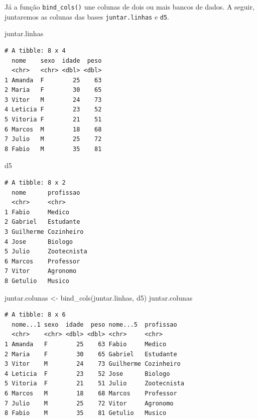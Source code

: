 \documentclass[
  brazilian,
]{book}
\newenvironment{Shaded}{\begin{snugshade}}{\end{snugshade}}
\newcommand{\FunctionTok}[1]{\textcolor[rgb]{0.00,0.00,0.00}{#1}}
\newcommand{\NormalTok}[1]{#1}
\newcommand{\OtherTok}[1]{\textcolor[rgb]{0.56,0.35,0.01}{#1}}
\begin{document}
Já a função \texttt{bind\_cols()} une colunas de dois ou mais bancos de dados. A seguir, juntaremos as colunas das bases \texttt{juntar.linhas} e \texttt{d5}.

\begin{Shaded}
\begin{Highlighting}[]
\NormalTok{juntar.linhas}
\end{Highlighting}
\end{Shaded}

\begin{verbatim}
# A tibble: 8 x 4
  nome    sexo  idade  peso
  <chr>   <chr> <dbl> <dbl>
1 Amanda  F        25    63
2 Maria   F        30    65
3 Vitor   M        24    73
4 Leticia F        23    52
5 Vitoria F        21    51
6 Marcos  M        18    68
7 Julio   M        25    72
8 Fabio   M        35    81
\end{verbatim}

\begin{Shaded}
\begin{Highlighting}[]
\NormalTok{d5}
\end{Highlighting}
\end{Shaded}

\begin{verbatim}
# A tibble: 8 x 2
  nome      profissao  
  <chr>     <chr>      
1 Fabio     Medico     
2 Gabriel   Estudante  
3 Guilherme Cozinheiro 
4 Jose      Biologo    
5 Julio     Zootecnista
6 Marcos    Professor  
7 Vitor     Agronomo   
8 Getulio   Musico     
\end{verbatim}

\begin{Shaded}
\begin{Highlighting}[]
\NormalTok{juntar.colunas }\OtherTok{\textless{}{-}} \FunctionTok{bind\_cols}\NormalTok{(juntar.linhas, d5)}
\NormalTok{juntar.colunas}
\end{Highlighting}
\end{Shaded}

\begin{verbatim}
# A tibble: 8 x 6
  nome...1 sexo  idade  peso nome...5  profissao  
  <chr>    <chr> <dbl> <dbl> <chr>     <chr>      
1 Amanda   F        25    63 Fabio     Medico     
2 Maria    F        30    65 Gabriel   Estudante  
3 Vitor    M        24    73 Guilherme Cozinheiro 
4 Leticia  F        23    52 Jose      Biologo    
5 Vitoria  F        21    51 Julio     Zootecnista
6 Marcos   M        18    68 Marcos    Professor  
7 Julio    M        25    72 Vitor     Agronomo   
8 Fabio    M        35    81 Getulio   Musico     
\end{verbatim}
\end{document}
